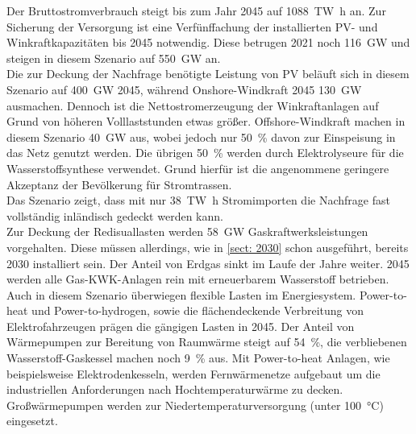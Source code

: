 		Der Bruttostromverbrauch steigt bis zum Jahr 2045 auf \SI{1088}{\tera \watt \hour} an. Zur Sicherung der Versorgung ist eine Verfünffachung der installierten PV- und Winkraftkapazitäten bis 2045 notwendig. Diese betrugen 2021 noch \SI{116}{\giga \watt} und steigen in diesem Szenario auf \SI{550}{\giga \watt} an.\\
		Die zur Deckung der Nachfrage benötigte Leistung von PV beläuft sich in diesem Szenario auf \SI{400}{\giga \watt} 2045, während Onshore-Windkraft 2045 \SI{130}{\giga \watt} ausmachen. Dennoch ist die Nettostromerzeugung der Winkraftanlagen auf Grund von höheren Volllaststunden etwas größer. Offshore-Windkraft machen in diesem Szenario \SI{40}{\giga \watt} aus, wobei jedoch nur \SI{50}{\percent} davon zur Einspeisung in das Netz genutzt werden. Die übrigen \SI{50}{\percent} werden durch Elektrolyseure für die Wasserstoffsynthese verwendet. Grund hierfür ist die angenommene geringere Akzeptanz der Bevölkerung für Stromtrassen.\\
		Das Szenario zeigt, dass mit nur \SI{38}{\tera \watt \hour} Stromimporten die Nachfrage fast vollständig inländisch gedeckt werden kann.\\
		
		Zur Deckung der Redisuallasten werden \SI{58}{\giga \watt} Gaskraftwerksleistungen vorgehalten. Diese müssen allerdings, wie in \ref{sect: 2030} schon ausgeführt, bereits 2030 installiert sein. Der Anteil von Erdgas sinkt im Laufe der Jahre weiter. 2045 werden alle Gas-KWK-Anlagen rein mit erneuerbarem Wasserstoff betrieben.\\
		
		Auch in diesem Szenario überwiegen flexible Lasten im Energiesystem. Power-to-heat und Power-to-hydrogen, sowie die flächendeckende Verbreitung von Elektrofahrzeugen prägen die gängigen Lasten in 2045. Der Anteil von Wärmepumpen zur Bereitung von Raumwärme steigt auf \SI{54}{\percent}, die verbliebenen Wasserstoff-Gaskessel machen noch \SI{9}{\percent} aus. Mit Power-to-heat Anlagen, wie beispielsweise Elektrodenkesseln, werden Fernwärmenetze aufgebaut um die industriellen Anforderungen nach Hochtemperaturwärme zu decken. Großwärmepumpen werden zur Niedertemperaturversorgung (unter \SI{100}{\degreeCelsius}) eingesetzt.\\
		
